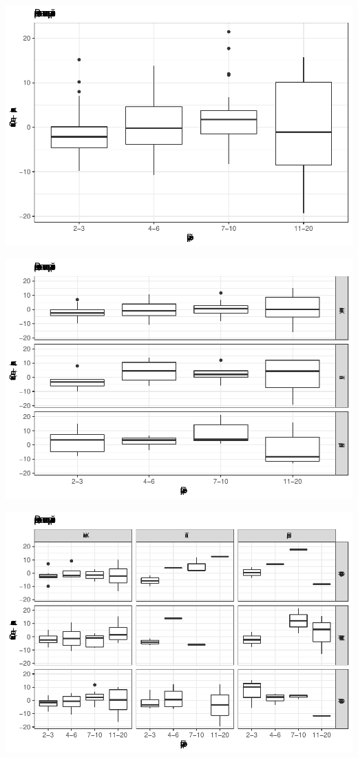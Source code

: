 \documentclass[
]{article}
\begin{document}
\begin{center}\includegraphics[width=0.9\linewidth]{Regression-model-for-estimating-RM_files/figure-latex/unnamed-chunk-32-1} \end{center}

\begin{center}\includegraphics[width=0.9\linewidth]{Regression-model-for-estimating-RM_files/figure-latex/unnamed-chunk-32-2} \end{center}

\begin{center}\includegraphics[width=0.9\linewidth]{Regression-model-for-estimating-RM_files/figure-latex/unnamed-chunk-32-3} \end{center}
\end{document}
